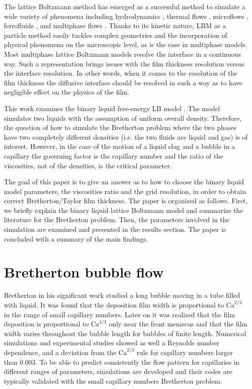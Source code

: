 \documentclass{article}
\newcommand{\Ca}{\mathrm{Ca}}
\begin{document}
The lattice Boltzmann method has emerged as a successful method to simulate
a wide variety of phenomena including hydrodynamics \cite{yu}, thermal flows
\cite{karlin-minimalmodels}, microflows \cite{ansumali-small-knudsen},
ferrofluids \cite{kuzmin-aniso}, and multiphase flows
\cite{swift,Shan-chen:extended}. Thanks to its kinetic nature, LBM as a particle
method easily tackles complex geometries and the incorporation of
physical phenomena on the microscopic level, as is the case in multiphase models. Most
multiphase lattice Boltzmann models \cite{swift, Shan-chen:extended} resolve
the interface in a continuous way. Such a representation
brings issues with the film thickness resolution versus the interface
resolution. In other words, when it comes to the resolution of the film
thickness the diffusive interface should be resolved in such a way as to have
negligible effect on the physics of the film.

This work examines the binary liquid free-energy LB model \cite{swift}. The
model simulates two liquids with the assumption of uniform overall
density. Therefore, the question of how to simulate the Bretherton problem
where the two phases have two completely different densities (i.e. the two fluids
are liquid and gas) is of interest. However, in the case of the motion of a
liquid slug and a bubble in a capillary the governing factor is the capillary number
and the ratio of the viscosities, not of the densities, is the critical parameter.

The goal of this paper is to give an answer as to how to choose the
binary liquid model parameters, the viscosities ratio and the grid
resolution, in order to obtain correct Bretherton/Taylor film thickness.
The paper is organized as follows.  First, we briefly
explain the binary liquid lattice Boltzmann model and summarize the literature
for the Bretherton problem. Then, the parameters involved in the
simulation are examined and presented in the results section. The paper is
concluded with a summary of the main findings.

\section{Bretherton bubble flow}
Bretherton in his significant work \cite{bretherton} studied a long bubble
moving in a tube filled with liquid. It was found that the deposition film width
is proportional to $\Ca^{2/3}$ in the range of small capillary numbers. Later on
it was realized \cite{wong-films,wong-pressure} that the film deposition
is proportional to $\Ca^{2/3}$ only near the front meniscus and that the film width
varies throughout the bubble length for bubbles of finite length. Numerical
simulations \cite{giavedoni-numerical} and experimental studies
\cite{kreutzer-pressure-drop} showed as well a Reynolds number dependence, and
a deviation from the $\Ca^{2/3}$ rule for capillary numbers larger than $0.003$.
To be able to predict consistently the flow pattern for capillaries in
different ranges of parameters, simulations are developed and their codes
are typically validated with the small capillary numbers Bretherton problem.
\end{document}
